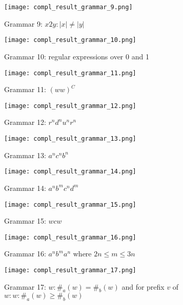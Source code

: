 \begin{figure}[h]
  \texttt{[image: compl\_result\_grammar\_9.png]}
  \caption{Grammar 9: $x2y: |x| \neq |y|$}
  \label{compl_result_grammar_9}
\end{figure}

\begin{figure}[h]
  \texttt{[image: compl\_result\_grammar\_10.png]}
  \caption{Grammar 10: regular expressions over 0 and 1}
  \label{compl_result_grammar_10}
\end{figure}

\begin{figure}[h]
  \texttt{[image: compl\_result\_grammar\_11.png]}
  \caption{Grammar 11: $(ww)^C$}
  \label{compl_result_grammar_11}
\end{figure}

\begin{figure}[h]
  \texttt{[image: compl\_result\_grammar\_12.png]}
  \caption{Grammar 12: $r^nd^nu^nr^n$}
  \label{compl_result_grammar_12}
\end{figure}

\begin{figure}[h]
  \texttt{[image: compl\_result\_grammar\_13.png]}
  \caption{Grammar 13: $a^nc^nb^n$}
  \label{compl_result_grammar_13}
\end{figure}

\begin{figure}[h]
  \texttt{[image: compl\_result\_grammar\_14.png]}
  \caption{Grammar 14: $a^nb^mc^nd^m$}
  \label{compl_result_grammar_14}
\end{figure}

\begin{figure}[h]
  \texttt{[image: compl\_result\_grammar\_15.png]}
  \caption{Grammar 15: $wcw$}
  \label{compl_result_grammar_15}
\end{figure}

\begin{figure}[h]
  \texttt{[image: compl\_result\_grammar\_16.png]}
  \caption{Grammar 16: $a^nb^ma^n$ where $2n \leq m \leq 3n$}
  \label{compl_result_grammar_16}
\end{figure}

\begin{figure}[h]
  \texttt{[image: compl\_result\_grammar\_17.png]}
  \caption{Grammar 17: $w: \#_a(w) = \#_b(w)$ and for prefix $v$ of $w: w: \#_a(w) \geq \#_b(w)$}
  \label{compl_result_grammar_17}
\end{figure}

